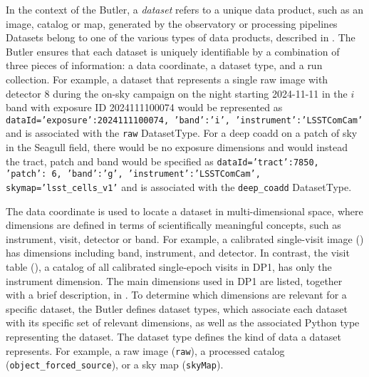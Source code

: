 In the context of the \gls{Butler}, a \emph{dataset} refers to a unique data product, such as an image, catalog or map, generated by the observatory or processing pipelines
Datasets belong to one of the various types of data products, described in .
The \gls{Butler} ensures that each dataset is uniquely identifiable by a combination of three pieces of information: a data coordinate, a dataset type, and a run collection.
For example, a dataset that represents a single raw image with detector 8 during the on-sky campaign on the night starting 2024-11-11 in the $i$ band with exposure ID 2024111100074 would be represented as  \texttt{dataId={'exposure':2024111100074, 'band':'i', 'instrument':'LSSTComCam'}} and is associated with the \texttt{raw} DatasetType.
For a deep coadd on a \gls{patch} of sky in the Seagull field, there would be no exposure dimensions and would instead the tract, \gls{patch} and band would be specified as  \texttt{dataId={'tract':7850, 'patch': 6, 'band':'g', 'instrument':'LSSTComCam', skymap='lsst\_cells\_v1'}} and is associated with the \texttt{deep\_coadd} DatasetType.



The data coordinate is used to locate a dataset in multi-dimensional space, where dimensions are defined in terms of scientifically meaningful concepts, such as instrument, visit, detector or band.
For example, a calibrated single-visit image () has dimensions including band, instrument, and detector.
In contrast, the visit table (), a catalog of all calibrated single-epoch visits in \gls{DP1}, has only the instrument dimension.
The main dimensions used in \gls{DP1} are listed, together with a brief description, in .
To determine which dimensions are relevant for a specific dataset, the \gls{Butler} defines dataset types, which associate each dataset with its specific set of relevant dimensions, as well as the associated Python type representing the dataset.
The dataset type defines the kind of data a dataset represents.
For example, a raw image  (\texttt{raw}), a processed catalog (\texttt{object\_forced\_source}), or a \gls{sky map} (\texttt{skyMap}).

